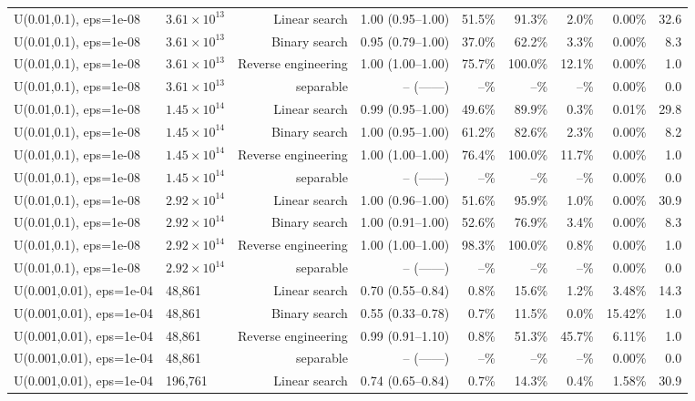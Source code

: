 \begin{tabular}{llrrrrrrr}
U(0.01,0.1), eps=1e-08 & $3.61\times 10^{13}$ & Linear search & 1.00 (0.95--1.00) & 51.5\% & 91.3\% & 2.0\% & 0.00\% & 32.6 \\
U(0.01,0.1), eps=1e-08 & $3.61\times 10^{13}$ & Binary search & 0.95 (0.79--1.00) & 37.0\% & 62.2\% & 3.3\% & 0.00\% & 8.3 \\
U(0.01,0.1), eps=1e-08 & $3.61\times 10^{13}$ & Reverse engineering & 1.00 (1.00--1.00) & 75.7\% & 100.0\% & 12.1\% & 0.00\% & 1.0 \\
U(0.01,0.1), eps=1e-08 & $3.61\times 10^{13}$ & separable & -- (------) & --\% & --\% & --\% & 0.00\% & 0.0 \\
U(0.01,0.1), eps=1e-08 & $1.45\times 10^{14}$ & Linear search & 0.99 (0.95--1.00) & 49.6\% & 89.9\% & 0.3\% & 0.01\% & 29.8 \\
U(0.01,0.1), eps=1e-08 & $1.45\times 10^{14}$ & Binary search & 1.00 (0.95--1.00) & 61.2\% & 82.6\% & 2.3\% & 0.00\% & 8.2 \\
U(0.01,0.1), eps=1e-08 & $1.45\times 10^{14}$ & Reverse engineering & 1.00 (1.00--1.00) & 76.4\% & 100.0\% & 11.7\% & 0.00\% & 1.0 \\
U(0.01,0.1), eps=1e-08 & $1.45\times 10^{14}$ & separable & -- (------) & --\% & --\% & --\% & 0.00\% & 0.0 \\
U(0.01,0.1), eps=1e-08 & $2.92\times 10^{14}$ & Linear search & 1.00 (0.96--1.00) & 51.6\% & 95.9\% & 1.0\% & 0.00\% & 30.9 \\
U(0.01,0.1), eps=1e-08 & $2.92\times 10^{14}$ & Binary search & 1.00 (0.91--1.00) & 52.6\% & 76.9\% & 3.4\% & 0.00\% & 8.3 \\
U(0.01,0.1), eps=1e-08 & $2.92\times 10^{14}$ & Reverse engineering & 1.00 (1.00--1.00) & 98.3\% & 100.0\% & 0.8\% & 0.00\% & 1.0 \\
U(0.01,0.1), eps=1e-08 & $2.92\times 10^{14}$ & separable & -- (------) & --\% & --\% & --\% & 0.00\% & 0.0 \\
U(0.001,0.01), eps=1e-04 & 48,861 & Linear search & 0.70 (0.55--0.84) & 0.8\% & 15.6\% & 1.2\% & 3.48\% & 14.3 \\
U(0.001,0.01), eps=1e-04 & 48,861 & Binary search & 0.55 (0.33--0.78) & 0.7\% & 11.5\% & 0.0\% & 15.42\% & 1.0 \\
U(0.001,0.01), eps=1e-04 & 48,861 & Reverse engineering & 0.99 (0.91--1.10) & 0.8\% & 51.3\% & 45.7\% & 6.11\% & 1.0 \\
U(0.001,0.01), eps=1e-04 & 48,861 & separable & -- (------) & --\% & --\% & --\% & 0.00\% & 0.0 \\
U(0.001,0.01), eps=1e-04 & 196,761 & Linear search & 0.74 (0.65--0.84) & 0.7\% & 14.3\% & 0.4\% & 1.58\% & 30.9 \\

\end{tabular}
